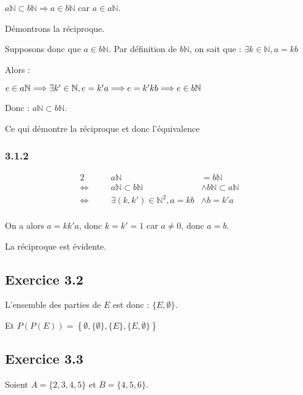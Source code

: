 \documentclass[a4paper,10pt]{report}
\begin{document}
$a\mathbb{N} \subset b\mathbb{N} \Longrightarrow a \in b\mathbb{N}$ car $a \in a\mathbb{N}$.

Démontrons la réciproque.

Supposons donc que $a \in b\mathbb{N}$. Par définition de $b\mathbb{N}$, on sait que : $\exists k \in \mathbb{N}, a=kb$

Alors :

$e \in a\mathbb{N} \\
\Longrightarrow \exists k' \in \mathbb{N}, e=k'a \\
\Longrightarrow e=k'kb \\
\Longrightarrow e \in b\mathbb{N}$

Donc : $a\mathbb{N} \subset b\mathbb{N}$.

Ce qui démontre la réciproque et donc l'équivalence


\subsubsection*{3.1.2}

\begin{alignat*}{2}
	                    &\quad &                           a\mathbb{N} &= b\mathbb{N}\\
	\Longleftrightarrow &      &       a\mathbb{N} \subset b\mathbb{N} &\wedge b\mathbb{N} \subset a\mathbb{N} \\
	\Longleftrightarrow &      & \exists (k,k') \in \mathbb{N}^2, a=kb &\wedge b=k'a \\
\end{alignat*}

On a alors $a=kk'a$, donc $k=k'=1$ car $a\neq 0$, donc $a=b$.

La réciproque est évidente.


\subsection*{Exercice 3.2}

L'ensemble des parties de $E$ est donc : $\{ E, \emptyset \}$.

Et $P(P(E)) = \left\lbrace \emptyset, \{\emptyset\}, \{ E\}, \{E, \emptyset \} \right\rbrace $

\subsection*{Exercice 3.3}

Soient $A= \{2, 3, 4 ,5\}$ et $B= \{4,5,6\}$.
\end{document}
